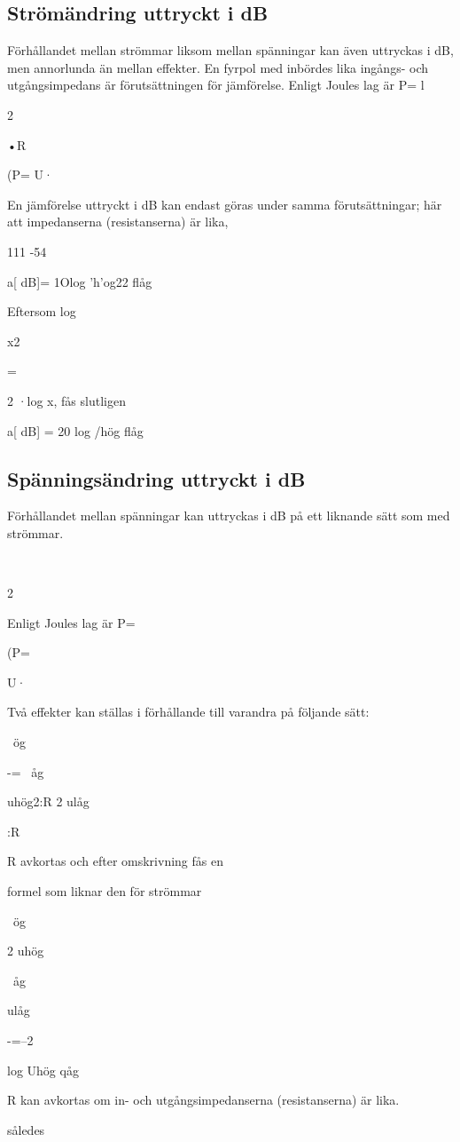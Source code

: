 \subsection{Strömändring uttryckt i dB}
Förhållandet mellan strömmar liksom mellan spänningar kan även uttryckas i dB, men
annorlunda än mellan effekter. En fyrpol
med inbördes lika ingångs- och utgångsimpedans är förutsättningen för jämförelse.
Enligt Joules lag är P= l

2

•R

(P= U·~

En jämförelse uttryckt i dB kan endast göras
under samma förutsättningar; här att impedanserna (resistanserna) är lika,

111 -54

a[ dB]= 1Olog 'h'og22
flåg

Eftersom log

x2

=

2 ·log x, fås slutligen

a[ dB] = 20 log /hög
flåg

\subsection{Spänningsändring uttryckt i dB}
Förhållandet mellan spänningar kan uttryckas i dB på ett liknande sätt som med
strömmar.

~

2

Enligt Joules lag är P=

(P=

U·~

Två effekter kan ställas i förhållande till varandra på följande sätt:

~ög

-=
~åg

uhög2:R
2
ulåg

:R

R avkortas och efter omskrivning fås en

formel som liknar den för strömmar

~ög

2
uhög

~åg

ulåg

-=--2

log Uhög
qåg

R kan avkortas om in- och utgångsimpedanserna (resistanserna) är lika.

således


